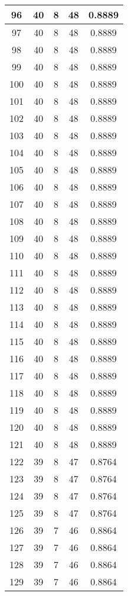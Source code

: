 \documentclass[letterpaper, 12pt]{article}
\begin{document}
\begin{longtable}{|c|c|c|c|c|}
\hline
96 & 40 & 8 & 48 & 0.8889 \\
\hline
97 & 40 & 8 & 48 & 0.8889 \\
\hline
98 & 40 & 8 & 48 & 0.8889 \\
\hline
99 & 40 & 8 & 48 & 0.8889 \\
\hline
100 & 40 & 8 & 48 & 0.8889 \\
\hline
101 & 40 & 8 & 48 & 0.8889 \\
\hline
102 & 40 & 8 & 48 & 0.8889 \\
\hline
103 & 40 & 8 & 48 & 0.8889 \\
\hline
104 & 40 & 8 & 48 & 0.8889 \\
\hline
105 & 40 & 8 & 48 & 0.8889 \\
\hline
106 & 40 & 8 & 48 & 0.8889 \\
\hline
107 & 40 & 8 & 48 & 0.8889 \\
\hline
108 & 40 & 8 & 48 & 0.8889 \\
\hline
109 & 40 & 8 & 48 & 0.8889 \\
\hline
110 & 40 & 8 & 48 & 0.8889 \\
\hline
111 & 40 & 8 & 48 & 0.8889 \\
\hline
112 & 40 & 8 & 48 & 0.8889 \\
\hline
113 & 40 & 8 & 48 & 0.8889 \\
\hline
114 & 40 & 8 & 48 & 0.8889 \\
\hline
115 & 40 & 8 & 48 & 0.8889 \\
\hline
116 & 40 & 8 & 48 & 0.8889 \\
\hline
117 & 40 & 8 & 48 & 0.8889 \\
\hline
118 & 40 & 8 & 48 & 0.8889 \\
\hline
119 & 40 & 8 & 48 & 0.8889 \\
\hline
120 & 40 & 8 & 48 & 0.8889 \\
\hline
121 & 40 & 8 & 48 & 0.8889 \\
\hline
122 & 39 & 8 & 47 & 0.8764 \\
\hline
123 & 39 & 8 & 47 & 0.8764 \\
\hline
124 & 39 & 8 & 47 & 0.8764 \\
\hline
125 & 39 & 8 & 47 & 0.8764 \\
\hline
126 & 39 & 7 & 46 & 0.8864 \\
\hline
127 & 39 & 7 & 46 & 0.8864 \\
\hline
128 & 39 & 7 & 46 & 0.8864 \\
\hline
129 & 39 & 7 & 46 & 0.8864 \\

\end{longtable}
\end{document}
